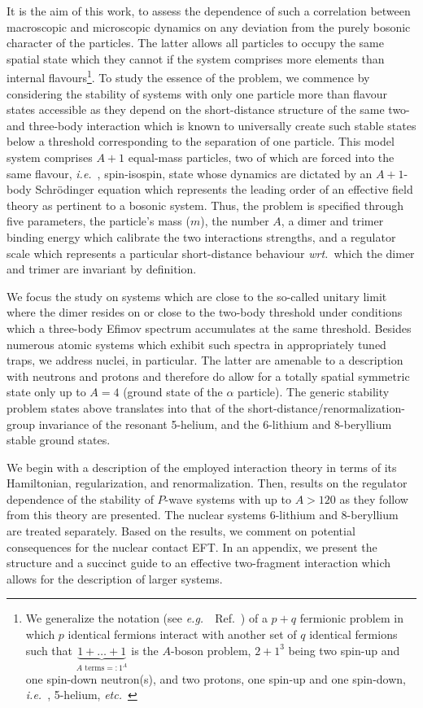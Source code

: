 \documentclass[preprint,12pt]{elsarticle}
\newcommand{\wrt}{\textit{wrt.}~}
\newcommand{\etc}{\textit{etc.}~}
\newcommand{\eg}{\textit{e.g.}~}
\newcommand{\ie}{\textit{i.e.}~}
\begin{document}
It is the aim of this work, to assess the dependence of such a correlation between macroscopic and microscopic
dynamics on any deviation from the purely bosonic character of the particles.
The latter allows all particles to occupy the same spatial state which they cannot if the system comprises
more elements than internal flavours\footnote{We generalize the notation (see \eg~Ref.~\cite{PhysRevA.92.053624})
of a $p+q$ fermionic 
problem in which $p$ identical fermions
interact with another set of $q$ identical fermions such that $\underbrace{1+\ldots+1}_{\text{$A$ terms}=:1^A}$ is 
the $A$-boson problem, $2+1^3$ being two spin-up and one spin-down neutron(s), and two protons, one spin-up and
one spin-down, \ie, 5-helium, \etc}.
To study the essence of the problem, we commence by considering the stability of systems with only one particle
more than flavour states accessible as they depend on the short-distance structure of the same two- and three-body
interaction which is known to universally create such stable states below a threshold corresponding to the separation
of one particle. This model system comprises $A+1$ equal-mass particles, two of which are forced into the same
flavour, \ie, spin-isospin, state whose dynamics are dictated by an $A+1$-body Schr\"odinger equation which
represents the leading order of an effective field theory as pertinent to a bosonic system.
Thus, the problem is specified through five parameters, the particle's mass ($m$), the number $A$, a dimer and trimer
binding energy which calibrate the two interactions strengths, and a regulator scale which represents a particular
short-distance behaviour \wrt which the dimer and trimer are invariant by definition.

We focus the study on systems which are close to the so-called unitary limit where the dimer resides on or close to
the two-body threshold under conditions which a three-body Efimov spectrum accumulates at the same threshold.
Besides numerous atomic systems which exhibit such spectra in appropriately tuned traps,
we address nuclei, in particular. The latter are amenable to a description with neutrons and protons and
therefore do allow for a totally spatial symmetric state only up to $A=4$ (ground state of the $\alpha$ particle).
The generic stability problem states above translates into that of the short-distance/renormalization-group
invariance of the resonant 5-helium, and the 6-lithium and 8-beryllium stable ground states. 

We begin with a description of the employed interaction theory in terms of its 
Hamiltonian, regularization, and renormalization. 
Then, results on the regulator dependence of the stability of $P$-wave systems with up to $A>120$ as they follow
from this theory are presented.
The nuclear systems 6-lithium and 8-beryllium are treated separately.
Based on the results, we comment on potential consequences for the nuclear contact EFT.
In an appendix, we present the structure and a succinct guide to an effective two-fragment interaction which
allows for the description of larger systems.
\end{document}
